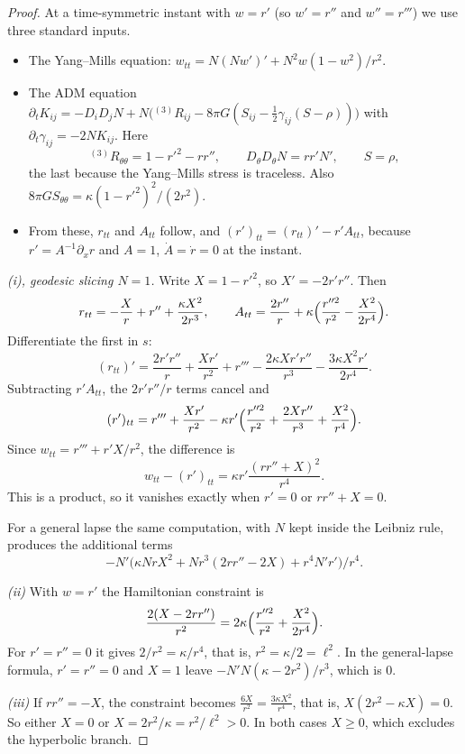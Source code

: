 \begin{proof}
At a time-symmetric instant with $w=r'$ (so $w'=r''$ and $w''=r'''$) we use three standard inputs.
\begin{itemize}
\item The Yang--Mills equation: $w_{tt}=N(Nw')'+N^2w(1-w^2)/r^2$.
\item The ADM equation $\partial_tK_{ij}=-D_iD_jN+N\bigl({}^{(3)}R_{ij}-8\pi G(S_{ij}-\frac12\gamma_{ij}(S-\rho))\bigr)$ with $\partial_t\gamma_{ij}=-2NK_{ij}$. Here
\[
{}^{(3)}R_{\theta\theta}=1-r'^2-rr'',\qquad D_\theta D_\theta N=rr'N',\qquad S=\rho ,
\]
the last because the Yang--Mills stress is traceless. Also $8\pi GS_{\theta\theta}=\kappa(1-r'^2)^2/(2r^2)$.
\item From these, $r_{tt}$ and $A_{tt}$ follow, and $(r')_{tt}=(r_{tt})'-r'A_{tt}$, because $r'=A^{-1}\partial_xr$ and $A=1$, $\dot A=\dot r=0$ at the instant.
\end{itemize}

\emph{(i), geodesic slicing $N=1$.} Write $X=1-r'^2$, so $X'=-2r'r''$. Then
\[
r_{tt}=-\frac Xr+r''+\frac{\kappa X^2}{2r^3},\qquad A_{tt}=\frac{2r''}r+\kappa\Bigl(\frac{r''^2}{r^2}-\frac{X^2}{2r^4}\Bigr).
\]
Differentiate the first in $s$:
\[
(r_{tt})'=\frac{2r'r''}r+\frac{Xr'}{r^2}+r'''-\frac{2\kappa Xr'r''}{r^3}-\frac{3\kappa X^2r'}{2r^4}.
\]
Subtracting $r'A_{tt}$, the $2r'r''/r$ terms cancel and
\[
(r')_{tt}=r'''+\frac{Xr'}{r^2}-\kappa r'\Bigl(\frac{r''^2}{r^2}+\frac{2Xr''}{r^3}+\frac{X^2}{r^4}\Bigr).
\]
Since $w_{tt}=r'''+r'X/r^2$, the difference is
\[
w_{tt}-(r')_{tt}=\kappa r'\frac{(rr''+X)^2}{r^4}.
\]
This is a product, so it vanishes exactly when $r'=0$ or $rr''+X=0$.

For a general lapse the same computation, with $N$ kept inside the Leibniz rule, produces the additional terms
\[
-N'\bigl(\kappa NrX^2+Nr^3(2rr''-2X)+r^4N'r'\bigr)/r^4 .
\]

\emph{(ii)} With $w=r'$ the Hamiltonian constraint is
\[
\frac{2(X-2rr'')}{r^2}=2\kappa\Bigl(\frac{r''^2}{r^2}+\frac{X^2}{2r^4}\Bigr).
\]
For $r'=r''=0$ it gives $2/r^2=\kappa/r^4$, that is, $r^2=\kappa/2=\ell^2$. In the general-lapse formula, $r'=r''=0$ and $X=1$ leave $-N'N(\kappa-2r^2)/r^3$, which is $0$.

\emph{(iii)} If $rr''=-X$, the constraint becomes $\frac{6X}{r^2}=\frac{3\kappa X^2}{r^4}$, that is, $X(2r^2-\kappa X)=0$. So either $X=0$ or $X=2r^2/\kappa=r^2/\ell^2>0$. In both cases $X\ge0$, which excludes the hyperbolic branch.
\end{proof}


